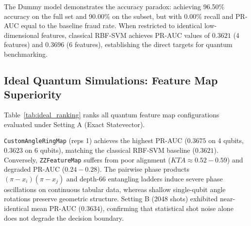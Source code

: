 \documentclass[12pt,a4paper]{article}
\begin{document}
The Dummy model demonstrates the accuracy paradox: achieving 96.50\% accuracy on the full set and 90.00\% on the subset, but with 0.00\% recall and PR-AUC equal to the baseline fraud rate. When restricted to identical low-dimensional features, classical RBF-SVM achieves PR-AUC values of $0.3621$ (4 features) and $0.3696$ (6 features), establishing the direct targets for quantum benchmarking.

\subsection{Ideal Quantum Simulations: Feature Map Superiority}

Table~\ref{tab:ideal_ranking} ranks all quantum feature map configurations evaluated under Setting A (Exact Statevector).

\begin{table}[ht]
\centering
\small
\caption{Quantum feature map ranking under Setting A (Mean over 5 repeats).}
\label{tab:ideal_ranking}
\end{table}

\texttt{CustomAngleRingMap} (reps 1) achieves the highest PR-AUC ($0.3675$ on 4 qubits, $0.3623$ on 6 qubits), matching the classical RBF-SVM baseline ($0.3621$). Conversely, \texttt{ZZFeatureMap} suffers from poor alignment ($KTA \approx 0.52 - 0.59$) and degraded PR-AUC ($0.24 - 0.28$). The pairwise phase products $(\pi - x_i)(\pi - x_j)$ and depth-66 entangling ladders induce severe phase oscillations on continuous tabular data, whereas shallow single-qubit angle rotations preserve geometric structure. Setting B (2048 shots) exhibited near-identical mean PR-AUC ($0.3634$), confirming that statistical shot noise alone does not degrade the decision boundary.
\end{document}
